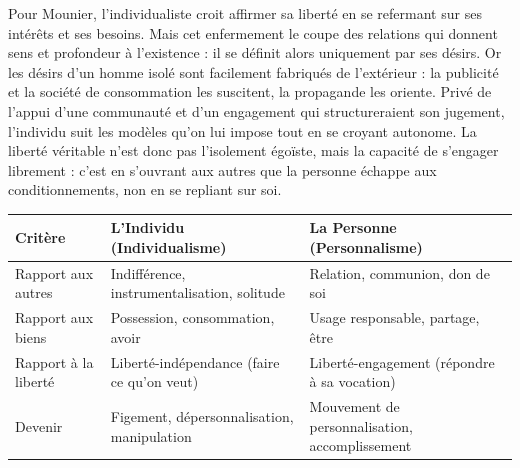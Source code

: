 \documentclass[11pt]{article}
\begin{document}
\begin{corrige}[Exercice 1]
Pour Mounier, l'individualiste croit affirmer sa liberté en se refermant sur ses intérêts et ses besoins. Mais cet enfermement le coupe des relations qui donnent sens et profondeur à l'existence : il se définit alors uniquement par ses désirs. Or les désirs d'un homme isolé sont facilement fabriqués de l'extérieur : la publicité et la société de consommation les suscitent, la propagande les oriente. Privé de l'appui d'une communauté et d'un engagement qui structureraient son jugement, l'individu suit les modèles qu'on lui impose tout en se croyant autonome. La liberté véritable n'est donc pas l'isolement égoïste, mais la capacité de s'engager librement : c'est en s'ouvrant aux autres que la personne échappe aux conditionnements, non en se repliant sur soi.
\end{corrige}

\begin{corrige}[Exercice 2]
\begin{center}
\begin{tabularx}{\linewidth}{|l|X|X|}
\hline
\rowcolor{popblueL} \textbf{Critère} & \textbf{L'Individu (Individualisme)} & \textbf{La Personne (Personnalisme)} \\
\hline
Rapport aux autres & Indifférence, instrumentalisation, solitude & Relation, communion, don de soi \\
\hline
Rapport aux biens & Possession, consommation, avoir & Usage responsable, partage, être \\
\hline
Rapport à la liberté & Liberté-indépendance (faire ce qu'on veut) & Liberté-engagement (répondre à sa vocation) \\
\hline
Devenir & Figement, dépersonnalisation, manipulation & Mouvement de personnalisation, accomplissement \\
\hline
\end{tabularx}
\end{center}
\end{corrige}
\end{document}
